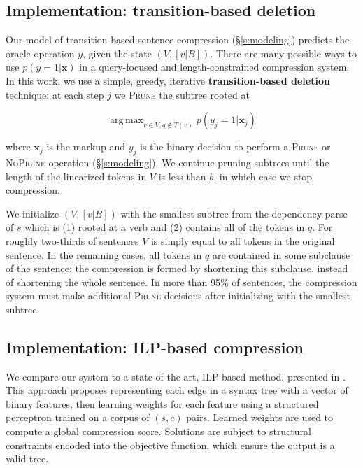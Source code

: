 \documentclass[11pt,a4paper]{article}
\DeclareMathOperator*{\argmaxA}{arg\,max} %
\begin{document}

\subsection{Implementation: transition-based deletion}\label{s:transition}

Our model of transition-based sentence compression (\S\ref{s:modeling}) predicts the oracle operation $y$, given the state $(V,[v|B])$. There are many possible ways to use $p(y=1| \bm{x})$ in a query-focused and length-constrained compression system. In this work, we use a simple, greedy, iterative \textbf{transition-based deletion} technique: at each step $j$ we \textsc{Prune} the subtree rooted at 

$$\argmaxA_{v \in V,q\not\in T(v)}   p(y_j = 1 | \bm{x}_j)$$

\noindent where $\bm{x}_j$ is the markup and $y_j$ is the binary decision to perform a \textsc{Prune} or \textsc{NoPrune} operation (\S\ref{s:modeling}). We continue pruning subtrees until the length of the linearized tokens in $V$ is less than $b$, in which case we stop compression. 

We initialize $(V, [v|B])$ with the smallest subtree from the dependency parse of $s$ which is (1) rooted at a verb and (2) contains all of the tokens in $q$. For roughly two-thirds of sentences $V$ is simply equal to all tokens in the original sentence. In the remaining cases, all tokens in $q$ are contained in some subclause of the sentence; the compression is formed by shortening this subclause, instead of shortening the whole sentence. In more than 95\% of sentences, the compression system must make additional \textsc{Prune} decisions after initializing with the smallest subtree.

\subsection{Implementation: ILP-based compression}\label{s:ilp}

We compare our system to a state-of-the-art, ILP-based method, presented in \citet{filippova2013overcoming}. This approach proposes representing each edge in a syntax tree with a vector of binary features, then learning weights for each feature using a structured perceptron trained on a corpus of $(s,c)$ pairs. Learned weights are used to compute a global compression score. Solutions are subject to structural constraints encoded into the objective function, which ensure the output is a valid tree.
\end{document}
